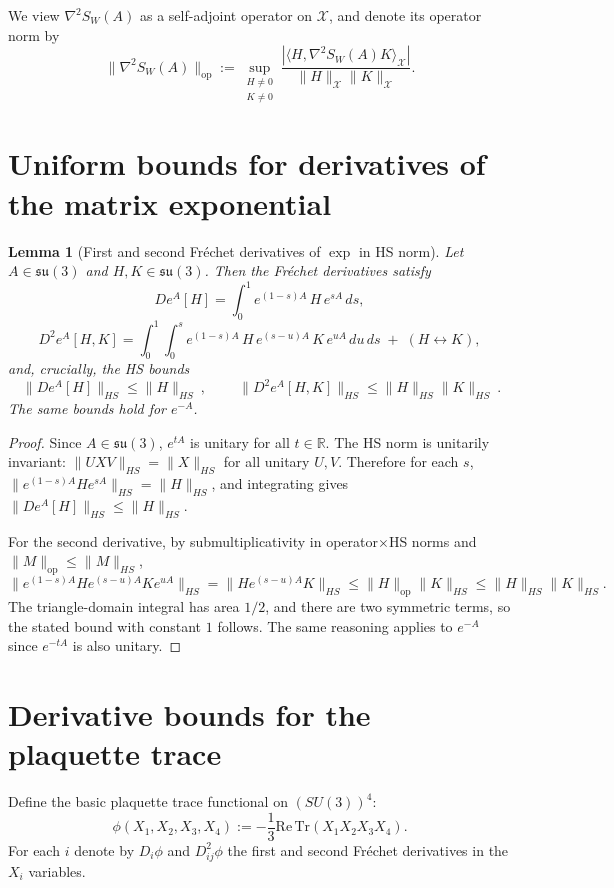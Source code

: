 \documentclass[11pt]{article}
\newtheorem{lemma}{Lemma}
\begin{document}
We view $\nabla^2 S_W(A)$ as a self-adjoint operator on $\mathcal{X}$, and denote its operator norm by
\[
\|\nabla^2 S_W(A)\|_{\mathrm{op}}
:=
\sup_{\substack{H\neq 0\\K\neq 0}}
\frac{|\langle H,\nabla^2 S_W(A)K\rangle_{\mathcal{X}}|}{\|H\|_{\mathcal{X}}\|K\|_{\mathcal{X}}}.
\]

\section{Uniform bounds for derivatives of the matrix exponential}

\begin{lemma}[First and second Fr\'echet derivatives of $\exp$ in HS norm]
\label{lem:exp-derivatives}
Let $A\in\mathfrak{su}(3)$ and $H,K\in\mathfrak{su}(3)$. Then the Fr\'echet derivatives satisfy
\[
De^{A}[H]=\int_0^1 e^{(1-s)A}\,H\,e^{sA}\,ds,
\]
\[
D^2e^{A}[H,K]=\int_0^1\!\!\int_0^s e^{(1-s)A}\,H\,e^{(s-u)A}\,K\,e^{uA}\,du\,ds
\;+\;
(H\leftrightarrow K),
\]
and, crucially, the HS bounds
\[
\boxed{\ \|De^A[H]\|_{HS}\le \|H\|_{HS}\ },
\qquad
\boxed{\ \|D^2e^A[H,K]\|_{HS}\le \|H\|_{HS}\|K\|_{HS}\ }.
\]
The same bounds hold for $e^{-A}$.
\end{lemma}

\begin{proof}
Since $A\in\mathfrak{su}(3)$, $e^{tA}$ is unitary for all $t\in\mathbb{R}$. The HS norm is unitarily invariant:
$\|UXV\|_{HS}=\|X\|_{HS}$ for all unitary $U,V$.
Therefore for each $s$,
$\|e^{(1-s)A}He^{sA}\|_{HS}=\|H\|_{HS}$, and integrating gives $\|De^A[H]\|_{HS}\le\|H\|_{HS}$.

For the second derivative, by submultiplicativity in operator$\times$HS norms and $\|M\|_{\mathrm{op}}\le\|M\|_{HS}$,
\[
\|e^{(1-s)A}H e^{(s-u)A}K e^{uA}\|_{HS}
=\|H e^{(s-u)A}K\|_{HS}
\le \|H\|_{\mathrm{op}}\|K\|_{HS}
\le \|H\|_{HS}\|K\|_{HS}.
\]
The triangle-domain integral has area $1/2$, and there are two symmetric terms, so the stated bound with constant $1$ follows.
The same reasoning applies to $e^{-A}$ since $e^{-tA}$ is also unitary.
\end{proof}

\section{Derivative bounds for the plaquette trace}

Define the basic plaquette trace functional on $(SU(3))^4$:
\[
\phi(X_1,X_2,X_3,X_4)
:=
-\frac{1}{3}\mathrm{Re\,Tr}(X_1X_2X_3X_4).
\]
For each $i$ denote by $D_i\phi$ and $D^2_{ij}\phi$ the first and second Fr\'echet derivatives in the $X_i$ variables.
\end{document}
